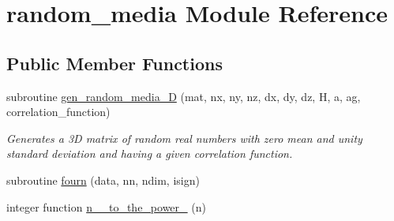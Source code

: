 \hypertarget{classrandom__media}{
\section{random\-\_\-media \-Module \-Reference}
\label{classrandom__media}
}
\subsection*{\-Public \-Member \-Functions}
\begin{DoxyCompactItemize}
\item 
subroutine \hyperlink{classrandom__media_aa74467eaffc9a721b0be1ad61869b31e}{gen\-\_\-random\-\_\-media\-\_\-D} (mat, nx, ny, nz, dx, dy, dz, \-H, a, ag, correlation\-\_\-function)
\begin{DoxyCompactList}\small\item\em \-Generates a 3\-D matrix of random real numbers with zero mean and unity standard deviation and having a given correlation function. \end{DoxyCompactList}\item 
subroutine \hyperlink{classrandom__media_aeed2ae9e5a7490a80210ce53238c429f}{fourn} (data, nn, ndim, isign)
\item 
integer function \hyperlink{classrandom__media_a4c07f6a199de1ab9a576ecd178f39451}{n\-\_\-\-\_\-to\-\_\-the\-\_\-power\-\_} (n)
\end{DoxyCompactItemize}


